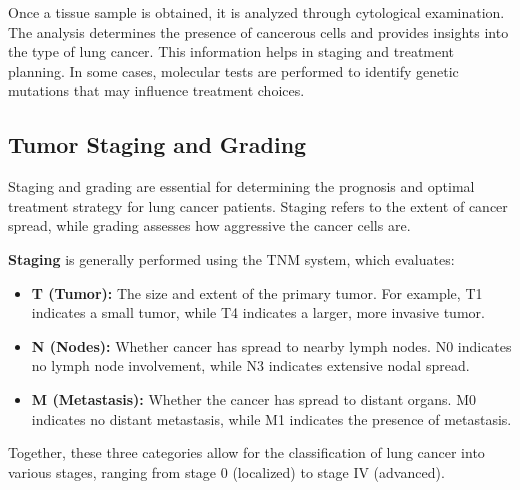 Once a tissue sample is obtained, it is analyzed through cytological examination. The analysis 
determines the presence of cancerous cells and provides insights into the type of lung cancer. This 
information helps in staging and treatment planning. In some cases, molecular tests are performed to 
identify genetic mutations that may influence treatment choices.


\subsection{Tumor Staging and Grading}

Staging and grading are essential for determining the prognosis and optimal treatment strategy for 
lung cancer patients. Staging refers to the extent of cancer spread, while grading assesses how 
aggressive the cancer cells are.

\textbf{Staging} is generally performed using the TNM system, which evaluates:

\begin{itemize}
    \item \textbf{T (Tumor):} The size and extent of the primary tumor. For example, T1 indicates a 
    small tumor, while T4 indicates a larger, more invasive tumor.

    \item \textbf{N (Nodes):} Whether cancer has spread to nearby lymph nodes. N0 indicates no lymph 
    node involvement, while N3 indicates extensive nodal spread.

    \item \textbf{M (Metastasis):} Whether the cancer has spread to distant organs. M0 indicates no 
    distant metastasis, while M1 indicates the presence of metastasis.
\end{itemize}

Together, these three categories allow for the classification of lung cancer into various stages, 
ranging from stage 0 (localized) to stage IV (advanced).

